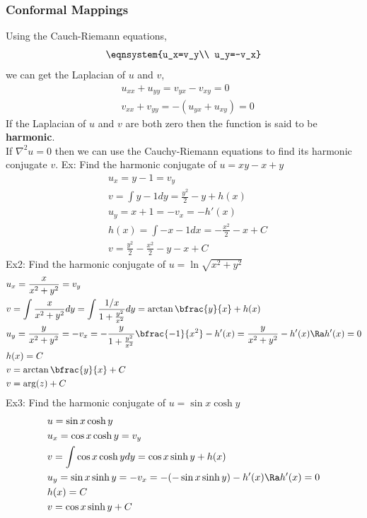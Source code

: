 \subsubsection{Conformal Mappings}
Using the Cauch-Riemann equations,
\[\eqnsystem{u_x=v_y\\ u_y=-v_x}\]
we can get the Laplacian of $u$ and $v$,
\begin{align*}
    &u_{xx}+u_{yy}=v_{yx}-v_{xy}=0\\
    &v_{xx}+v_{yy}=-(u_{yx}+u_{xy})=0
\end{align*}
If the Laplacian of $u$ and $v$ are both zero then the function is said to be \textbf{harmonic}.\\
If $\nabla^2u=0$ then we can use the Cauchy-Riemann equations to find its harmonic conjugate $v$.
Ex: Find the harmonic conjugate of $u=xy-x+y$
\begin{align*}
    &u_x=y-1=v_y\\
    &v=\int y-1 dy=\frac{y^2}{2}-y+h(x)\\
    &u_y=x+1=-v_x=-h'(x)\\
    &h(x)=\int -x-1 dx=-\frac{x^2}{2}-x+C\\
    &v=\frac{y^2}{2}-\frac{x^2}{2}-y-x+C
\end{align*}
Ex2: Find the harmonic conjugate of $u=\ln\sqrt{x^2+y^2}$
\begin{align*}
    &u_x=\frac{x}{x^2+y^2}=v_y\\
    &v=\int\frac{x}{x^2+y^2}dy=\int\frac{1/x}{1+\frac{y^2}{x^2}}dy=\arctan\bfrac{y}{x}+h(x)\\
    &u_y=\frac{y}{x^2+y^2}=-v_x=-\frac{y}{1+\frac{y^2}{x^2}}\bfrac{-1}{x^2}-h'(x)=\frac{y}{x^2+y^2}-h'(x)\Ra h'(x)=0\\
    &h(x)=C\\
    &v=\arctan\bfrac{y}{x}+C\\
    &v=\arg(z)+C
\end{align*}
Ex3: Find the harmonic conjugate of $u=\sin x\cosh y$
\begin{align*}
    &u=\sin x\cosh y\\
    &u_x=\cos x\cosh y=v_y\\
    &v=\int \cos x\cosh y dy=\cos x\sinh y+h(x)\\
    &u_y=\sin x\sinh y=-v_x=-(-\sin x\sinh y)-h'(x)\Ra h'(x)=0\\
    &h(x)=C\\
    &v=\cos x\sinh y+C
\end{align*}

